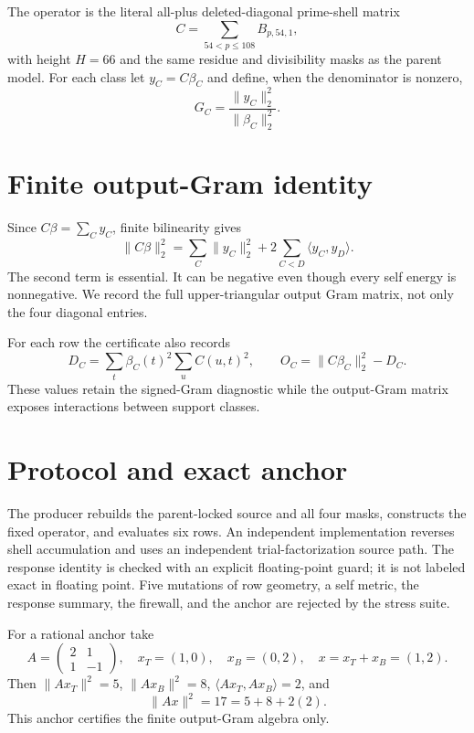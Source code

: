 \documentclass[10pt]{article}
\begin{document}
The operator is the literal all-plus deleted-diagonal prime-shell matrix
\[
 C=\sum_{54<p\le108}B_{p,54,1},
\]
with height $H=66$ and the same residue and divisibility masks as the parent
model.  For each class let $y_C=C\beta_C$ and define, when the denominator
is nonzero,
\[
 G_C=\frac{\|y_C\|_2^2}{\|\beta_C\|_2^2}.
\]

\section{Finite output-Gram identity}
Since $C\beta=\sum_Cy_C$, finite bilinearity gives
\begin{equation}\label{eq:response}
 \|C\beta\|_2^2=\sum_C\|y_C\|_2^2+
 2\sum_{C<D}\langle y_C,y_D\rangle.
\end{equation}
The second term is essential.  It can be negative even though every self
energy is nonnegative.  We record the full upper-triangular output Gram
matrix, not only the four diagonal entries.

For each row the certificate also records
\[
 D_C=\sum_t\beta_C(t)^2\sum_u C(u,t)^2,\qquad
 O_C=\|C\beta_C\|_2^2-D_C.
\]
These values retain the signed-Gram diagnostic while the output-Gram matrix
exposes interactions between support classes.

\section{Protocol and exact anchor}
The producer rebuilds the parent-locked source and all four masks, constructs
the fixed operator, and evaluates six rows.  An independent implementation
reverses shell accumulation and uses an independent trial-factorization
source path.  The response identity is checked with an explicit floating-point
guard; it is not labeled exact in floating point.  Five mutations of row
geometry, a self metric, the response summary, the firewall, and the anchor
are rejected by the stress suite.

For a rational anchor take
\[
 A=\begin{pmatrix}2&1\\1&-1\end{pmatrix},\quad
 x_T=(1,0),\quad x_B=(0,2),\quad x=x_T+x_B=(1,2).
\]
Then $\|Ax_T\|^2=5$, $\|Ax_B\|^2=8$,
$\langle Ax_T,Ax_B\rangle=2$, and
\[
 \|Ax\|^2=17=5+8+2(2).
\]
This anchor certifies the finite output-Gram algebra only.
\end{document}
